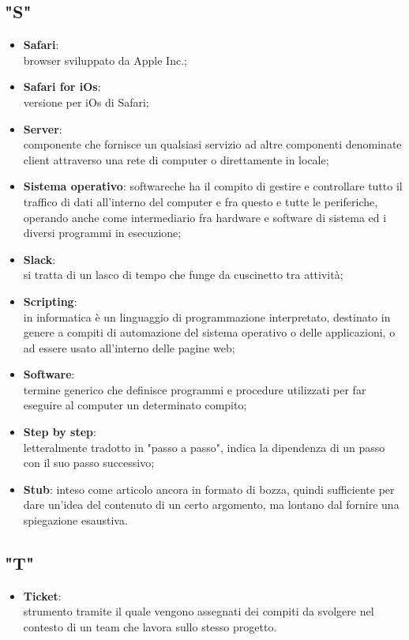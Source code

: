 \subsection{"S"}
\begin{itemize}
\item \textbf{Safari}:\\ browser sviluppato da Apple Inc.;
\item \textbf{Safari for iOs}:\\ versione per iOs di Safari;
\item \textbf{Server}:\\ componente che fornisce un qualsiasi servizio ad altre componenti denominate client attraverso una rete di computer o direttamente in locale;
\item \textbf{Sistema operativo}: software\ped che ha il compito di gestire e controllare tutto il traffico di dati all’interno del computer e fra questo e tutte le periferiche, operando anche come intermediario fra hardware e software di sistema ed i diversi programmi in esecuzione;
\item \textbf{Slack}:\\ si tratta di un lasco di tempo che funge da cuscinetto tra attività;
\item \textbf{Scripting}:\\ in informatica è un linguaggio di programmazione interpretato, destinato in genere a compiti di automazione del sistema operativo o delle applicazioni, o ad essere usato all'interno delle pagine web;
\item \textbf{Software}:\\ termine generico che definisce programmi e procedure utilizzati per far eseguire al computer un determinato compito;
\item \textbf{Step by step}:\\ letteralmente tradotto in "passo a passo", indica la dipendenza di un passo con il suo passo successivo;
\item \textbf{Stub}: inteso come articolo ancora in formato di bozza, quindi sufficiente per dare un'idea del contenuto di un certo argomento, ma lontano dal fornire una spiegazione esaustiva.
\end{itemize} 

\subsection{"T"}
\begin{itemize}
\item \textbf{Ticket}:\\ strumento tramite il quale vengono assegnati dei compiti da svolgere nel contesto di un team che lavora sullo stesso progetto.
\end{itemize}

